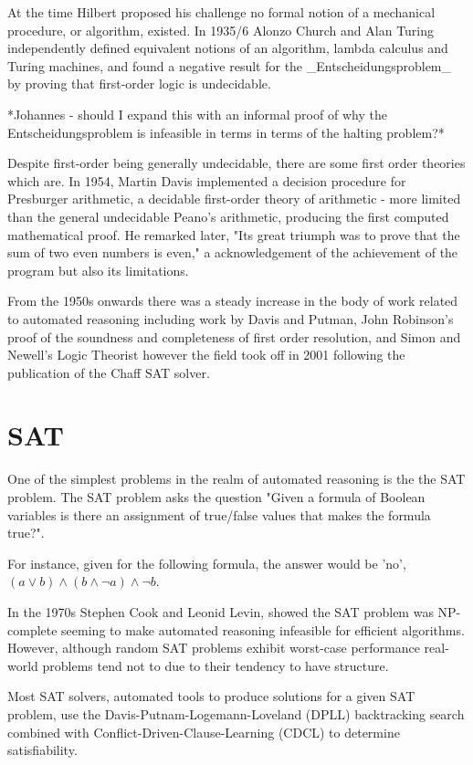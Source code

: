 \documentclass[]{final_report}
\begin{document}
At the time Hilbert proposed his challenge no formal notion of a mechanical procedure, or algorithm, existed. In 1935/6 Alonzo Church and Alan Turing independently defined equivalent notions of an algorithm, lambda calculus and Turing machines, and found a negative result for the _Entscheidungsproblem_  by proving that first-order logic is undecidable. 

*Johannes - should I expand this with an informal proof of why the Entscheidungsproblem is infeasible in terms in terms of the halting problem?*

Despite first-order being generally undecidable, there are some first order theories which are. In 1954, Martin Davis implemented a decision procedure for Presburger arithmetic, a decidable first-order theory of arithmetic - more limited than the general undecidable Peano's arithmetic, producing the first computed mathematical proof. He remarked later, "Its great triumph was to prove that the sum of two even numbers is even," a acknowledgement of the achievement of the program but also its limitations.

From the 1950s onwards there was a steady increase in the body of work related to automated reasoning including work by Davis and Putman, John Robinson's proof of the soundness and completeness of first order resolution, and Simon and Newell's Logic Theorist however the field took off in 2001 following the publication of the Chaff SAT solver.

\section{SAT}
One of the simplest problems in the realm of automated reasoning is the the SAT problem. The SAT problem asks the question "Given a formula of Boolean variables is there an assignment of true/false values that makes the formula true?". 

For instance, given for the following formula, the answer would be 'no',  $(a \lor b) \land (b \land \lnot a) \land \lnot b $.

In the 1970s Stephen Cook and Leonid Levin, showed the SAT problem was NP-complete seeming to make automated reasoning infeasible for efficient algorithms. However, although random SAT problems exhibit worst-case performance real-world problems tend not to due to their tendency to have structure. 

Most SAT solvers, automated tools to produce solutions for a given SAT problem, use the Davis-Putnam-Logemann-Loveland (DPLL) backtracking search combined with Conflict-Driven-Clause-Learning (CDCL) to determine satisfiability.
\end{document}
